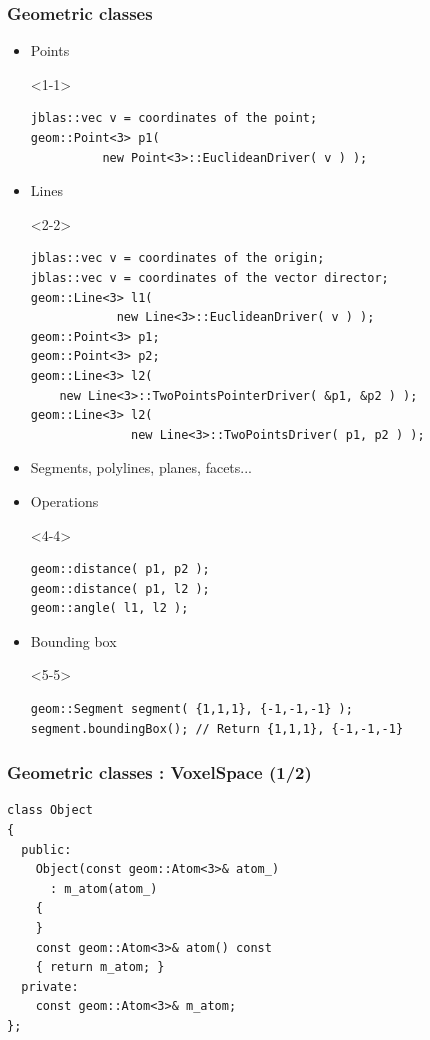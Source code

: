 \documentclass[pdf]{beamer}
\begin{document}
\begin{frame}[fragile]
  \frametitle{Geometric classes}
  \begin{itemize}
    \item<1-> Points
      \begin{onlyenv}<1-1>
        \begin{lstlisting}
jblas::vec v = coordinates of the point;
geom::Point<3> p1( 
          new Point<3>::EuclideanDriver( v ) );
        \end{lstlisting}
      \end{onlyenv}
    \item<2-> Lines
      \begin{onlyenv}<2-2>
        \begin{lstlisting}
jblas::vec v = coordinates of the origin;
jblas::vec v = coordinates of the vector director;
geom::Line<3> l1( 
            new Line<3>::EuclideanDriver( v ) );
geom::Point<3> p1;
geom::Point<3> p2;
geom::Line<3> l2(
    new Line<3>::TwoPointsPointerDriver( &p1, &p2 ) );
geom::Line<3> l2(
              new Line<3>::TwoPointsDriver( p1, p2 ) );
        \end{lstlisting}
      \end{onlyenv}
     \item<3-> Segments, polylines, planes, facets...
     \item<4-> Operations
      \begin{onlyenv}<4-4>
        \begin{lstlisting}
geom::distance( p1, p2 );
geom::distance( p1, l2 );
geom::angle( l1, l2 );
        \end{lstlisting}
      \end{onlyenv}
     \item<5-> Bounding box
\begin{onlyenv}<5-5>
  \begin{lstlisting}
geom::Segment segment( {1,1,1}, {-1,-1,-1} );
segment.boundingBox(); // Return {1,1,1}, {-1,-1,-1}
  \end{lstlisting}
\end{onlyenv}
  \end{itemize}
\end{frame}

\begin{frame}[fragile]
  \frametitle{Geometric classes : VoxelSpace (1/2)}

  \begin{lstlisting}
class Object
{
  public:
    Object(const geom::Atom<3>& atom_)
      : m_atom(atom_)
    {
    }
    const geom::Atom<3>& atom() const 
    { return m_atom; }
  private:
    const geom::Atom<3>& m_atom;
};
  \end{lstlisting}
\end{frame}
\end{document}
